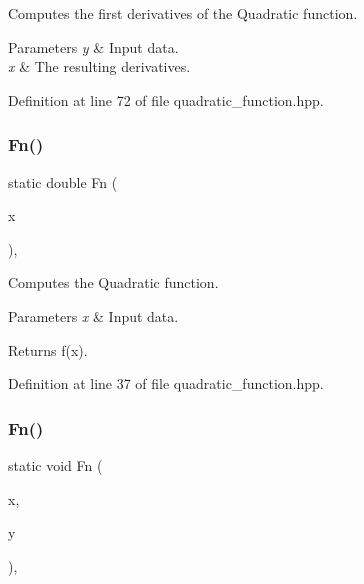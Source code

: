 Computes the first derivatives of the Quadratic function. 


\begin{DoxyParams}{Parameters}
{\em y} & Input data. \\
\hline
{\em x} & The resulting derivatives. \\
\hline
\end{DoxyParams}


Definition at line 72 of file quadratic\+\_\+function.\+hpp.

\mbox{\label{classmlpack_1_1ann_1_1QuadraticFunction_a11bd9a1195e6b107f9fee73643bc328b}} 
\subsubsection{Fn()\hspace{0.1cm}{\footnotesize\ttfamily [1/2]}}
{\footnotesize\ttfamily static double Fn (\begin{DoxyParamCaption}\item[{const double}]{x }\end{DoxyParamCaption})\hspace{0.3cm}{\ttfamily [inline]}, {\ttfamily [static]}}



Computes the Quadratic function. 


\begin{DoxyParams}{Parameters}
{\em x} & Input data. \\
\hline
\end{DoxyParams}
\begin{DoxyReturn}{Returns}
f(x). 
\end{DoxyReturn}


Definition at line 37 of file quadratic\+\_\+function.\+hpp.

\mbox{\label{classmlpack_1_1ann_1_1QuadraticFunction_af6cf5da90eb6312e3e25c9b8bd9c3527}} 
\subsubsection{Fn()\hspace{0.1cm}{\footnotesize\ttfamily [2/2]}}
{\footnotesize\ttfamily static void Fn (\begin{DoxyParamCaption}\item[{const Input\+Vec\+Type \&}]{x,  }\item[{Output\+Vec\+Type \&}]{y }\end{DoxyParamCaption})\hspace{0.3cm}{\ttfamily [inline]}, {\ttfamily [static]}}



